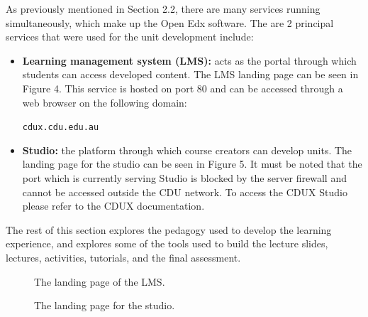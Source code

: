 \documentclass[a4paper]{article}
\begin{document}
As previously mentioned in Section 2.2, there are many services running simultaneously, which make up the Open Edx software. The are 2 principal services that were used for the unit development include:
\begin{itemize}
\item \textbf{Learning management system (LMS):} acts as the portal through which students can access developed content. The LMS landing page can be seen in Figure 4. This service is hosted on port 80 and can be accessed through a web browser on the following domain:
\begin{center}
\verb|cdux.cdu.edu.au|
\end{center}

\item \textbf{Studio:} the platform through which course creators can develop units. The landing page for the studio can be seen in Figure 5. It must be noted that the port which is currently serving Studio is blocked by the server firewall and cannot be accessed outside the CDU network. To access the CDUX Studio please refer to the CDUX documentation.
\end{itemize}

The rest of this section explores the pedagogy used to develop the learning experience, and explores some of the tools used to build the lecture slides, lectures, activities, tutorials, and the final assessment.

\begin{figure}[h]
\centering
{}
\caption{The landing page of the LMS.}
\end{figure}
\hspace{1.5cm}
\begin{figure}[h]
\centering
{}
\caption{The landing page for the studio.}
\end{figure}
\end{document}
